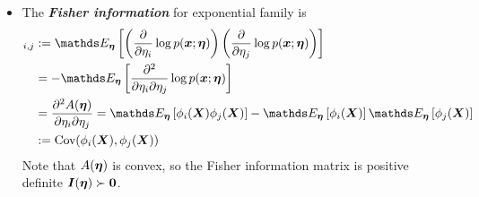 \documentclass[11pt]{article}
\begin{document}
\begin{itemize}
\item The \emph{\textbf{Fisher information}} for exponential family is 
\begin{align}
[\mb{I}(\mb{\eta})]_{i,j} &:= \E{\mb{\eta}}{\paren{\partdiff{}{\eta_{i}}\log p(\mb{x}; \mb{\eta})}\paren{\partdiff{}{\eta_{j}} \log p(\mb{x}; \mb{\eta})}} \nonumber\\
&= -\E{\mb{\eta}}{\frac{\partial^2 }{\partial \eta_{i} \partial \eta_{j}} \log p(\mb{x}; \mb{\eta}) } \label{eqn: fisher_information}\\
&= \frac{\partial^2 A(\mb{\eta})}{\partial \eta_{i} \partial \eta_{j}} =\E{\mb{\eta}}{\phi_{i}(\mb{X})\phi_{j}(\mb{X})} -  \E{\mb{\eta}}{\phi_{i}(\mb{X})} \E{\mb{\eta}}{\phi_{j}(\mb{X})}\label{eqn: fisher_information_partition_second_order} \\
&:= \text{Cov}(\phi_{i}(\mb{X}), \phi_{j}(\mb{X})) \nonumber
\end{align}
Note that $A(\boldsymbol{\eta})$ is convex, so the Fisher information matrix is positive definite $\boldsymbol{I}(\boldsymbol{\eta}) \succ \boldsymbol{0}$.


%
%
\end{itemize}
\end{document}
